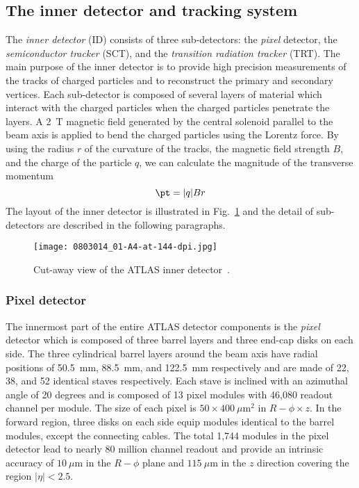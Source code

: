 
\subsection{The inner detector and tracking system}
\label{subsec:ae_inner_detector}
The \textit{inner detector} (ID) consists of three sub-detectors: the \textit{pixel} detector, the \textit{semiconductor tracker}  (SCT), and the \textit{transition radiation tracker} (TRT).
The main purpose of the inner detector is to provide high precision measurements of the tracks of charged particles and to reconstruct the primary and secondary vertices.
Each sub-detector is composed of several layers of material which interact with the charged particles when the charged particles penetrate the layers.
A  2~T magnetic field generated by the central solenoid parallel to the beam axis is applied to bend the charged particles using the Lorentz force.
By using the radius $r$ of the curvature of the tracks, the magnetic field strength $B$, and the charge of the particle $q$, we can calculate the magnitude of the transverse momentum \pt
%
\begin{equation}
    \pt = |q|Br
\end{equation}
%
The layout of the inner detector is illustrated in Fig.~\ref{fig:ae_inner_detector} and the detail of sub-detectors are described in the following paragraphs.

\begin{figure}[htbp]
    \begin{center}
        \texttt{[image: 0803014\_01-A4-at-144-dpi.jpg]}
        \caption{Cut-away view of the ATLAS inner detector~\cite{Aad:2008zzm}.}
        \label{fig:ae_inner_detector}
    \end{center}
\end{figure}


\subsubsection{Pixel detector}
\label{subsubsec:ae_pixel}
The innermost part of the entire ATLAS detector components is the \textit{pixel} detector which is composed of three barrel layers and three end-cap disks on each side.
The three cylindrical barrel layers around the beam axis have radial positions of 50.5~mm, 88.5~mm, and 122.5~mm respectively and are made of 22, 38, and 52 identical staves respectively.
Each stave is inclined with an azimuthal angle of 20 degrees and is composed of 13 pixel modules with 46,080 readout channel per module.
The size of each pixel is $50 \times 400~\mu$m$^{2}$ in $R-\phi \times z$.
In the forward region, three disks on each side equip modules identical to the barrel modules, except the connecting cables. 
The total 1,744 modules in the pixel detector lead to nearly 80 million channel readout and provide an intrinsic accuracy of $10~\mu$m in the $R-\phi$ plane and $115~\mu$m in the $z$ direction covering the region $|\eta| < 2.5$. 

